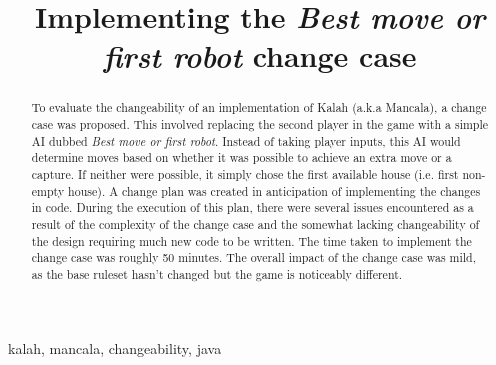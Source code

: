 \documentclass[10pt, a4paper, conference]{IEEEtran}
\begin{document}
\title{Implementing the \textit{Best move or first robot} change case}

\author{
}

\maketitle

\begin{abstract}
  To evaluate the changeability of an implementation of Kalah (a.k.a Mancala), a change case was
  proposed. This involved replacing the second player in the game with a simple
  AI dubbed \textit{Best move or first robot}. Instead of taking player inputs,
  this AI would determine moves based on whether it was possible to achieve an
  extra move or a capture. If neither were possible, it simply chose the first
  available house (i.e. first non-empty house). A change plan was created in anticipation
  of implementing the changes in code. During the execution of this plan, there
  were several issues encountered as a result of the complexity of the change
  case and the somewhat lacking changeability of the design requiring much new
  code to be written. The time taken to implement the change case was roughly 50 minutes.
  The overall impact of the change case was mild, as the base ruleset hasn't
  changed but the game is noticeably different. 
\end{abstract}

\begin{IEEEkeywords}
kalah, mancala, changeability, java
\end{IEEEkeywords}
\end{document}
